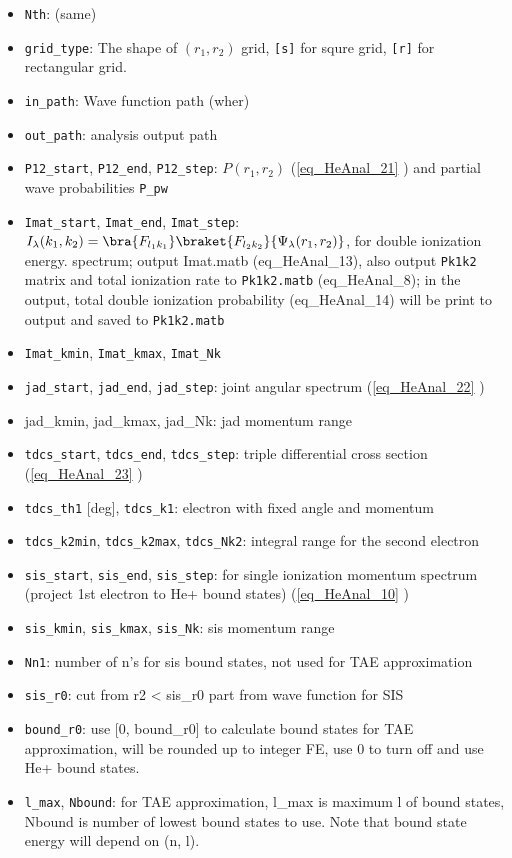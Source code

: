
\begin{itemize}
\item \verb`Nth`: (same)
\item \verb`grid_type`: The shape of $(r_1,r_2)$ grid, \verb`[s]` for squre grid, \verb`[r]` for rectangular grid.
\item \verb`in_path`: Wave function path (wher)
\item \verb`out_path`: analysis output path

\item \verb`P12_start`, \verb`P12_end`, \verb`P12_step`: $P(r_1, r_2)$ (\autoref{eq_HeAnal_21} ) and partial wave probabilities \verb`P_pw`

\item \verb`Imat_start`, \verb`Imat_end`, \verb`Imat_step`: $I_\lambda(k_1, k_2) = \bra{F_{l_1k_1}}\braket{F_{l_2k_2}}{\Psi_\lambda(r_1,r_2)}$, for double ionization energy. spectrum; output Imat.matb (eq_HeAnal_13), also output \verb`Pk1k2` matrix and total ionization rate to \verb`Pk1k2.matb` (eq_HeAnal_8); in the output, total double ionization probability (eq_HeAnal_14) will be print to output and saved to \verb`Pk1k2.matb`
\item \verb`Imat_kmin`, \verb`Imat_kmax`, \verb`Imat_Nk`

\item \verb`jad_start`, \verb`jad_end`, \verb`jad_step`: joint angular spectrum (\autoref{eq_HeAnal_22} )
\item jad_kmin, jad_kmax, jad_Nk: jad momentum range

\item \verb`tdcs_start`, \verb`tdcs_end`, \verb`tdcs_step`: triple differential cross section (\autoref{eq_HeAnal_23} )
\item \verb`tdcs_th1` [deg], \verb`tdcs_k1`: electron with fixed angle and momentum
\item \verb`tdcs_k2min`, \verb`tdcs_k2max`, \verb`tdcs_Nk2`: integral range for the second electron

\item \verb`sis_start`, \verb`sis_end`, \verb`sis_step`: for single ionization momentum spectrum (project 1st electron to He+ bound states) (\autoref{eq_HeAnal_10} )
\item \verb`sis_kmin`, \verb`sis_kmax`, \verb`sis_Nk`: sis momentum range
\item \verb`Nn1`: number of n's for sis bound states, not used for TAE approximation
\item \verb`sis_r0`: cut from r2 < sis_r0 part from wave function for SIS
\item \verb`bound_r0`: use [0, bound_r0] to calculate bound states for TAE approximation, will be rounded up to integer FE, use 0 to turn off and use He+ bound states.
\item \verb`l_max`, \verb`Nbound`: for TAE approximation, l_max is maximum l of bound states, Nbound is number of lowest bound states to use. Note that bound state energy will depend on (n, l).


\end{itemize}
